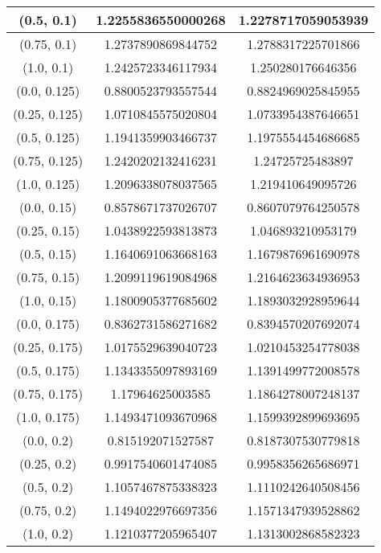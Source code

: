 \begin{table}[H]
\begin{tabular}{|c|c|c|}
\hline
(0.5, 0.1) & 1.2255836550000268 & 1.2278717059053939 \\
\hline
(0.75, 0.1) & 1.2737890869844752 & 1.2788317225701866 \\
\hline
(1.0, 0.1) & 1.2425723346117934 & 1.250280176646356 \\
\hline
\hline
(0.0, 0.125) & 0.8800523793557544 & 0.8824969025845955 \\
\hline
(0.25, 0.125) & 1.0710845575020804 & 1.0733954387646651 \\
\hline
(0.5, 0.125) & 1.1941359903466737 & 1.1975554454686685 \\
\hline
(0.75, 0.125) & 1.2420202132416231 & 1.24725725483897 \\
\hline
(1.0, 0.125) & 1.2096338078037565 & 1.219410649095726 \\
\hline
\hline
(0.0, 0.15) & 0.8578671737026707 & 0.8607079764250578 \\
\hline
(0.25, 0.15) & 1.0438922593813873 & 1.046893210953179 \\
\hline
(0.5, 0.15) & 1.1640691063668163 & 1.1679876961690978 \\
\hline
(0.75, 0.15) & 1.2099119619084968 & 1.2164623634936953 \\
\hline
(1.0, 0.15) & 1.1800905377685602 & 1.1893032928959644 \\
\hline
\hline
(0.0, 0.175) & 0.8362731586271682 & 0.8394570207692074 \\
\hline
(0.25, 0.175) & 1.0175529639040723 & 1.0210453254778038 \\
\hline
(0.5, 0.175) & 1.1343355097893169 & 1.1391499772008578 \\
\hline
(0.75, 0.175) & 1.17964625003585 & 1.1864278007248137 \\
\hline
(1.0, 0.175) & 1.1493471093670968 & 1.1599392899693695 \\
\hline
\hline
(0.0, 0.2) & 0.815192071527587 & 0.8187307530779818 \\
\hline
(0.25, 0.2) & 0.9917540601474085 & 0.9958356265686971 \\
\hline
(0.5, 0.2) & 1.1057467875338323 & 1.1110242640508456 \\
\hline
(0.75, 0.2) & 1.1494022976697356 & 1.1571347939528862 \\
\hline
(1.0, 0.2) & 1.1210377205965407 & 1.1313002868582323 \\
\hline
\end{tabular}
\end{table}
